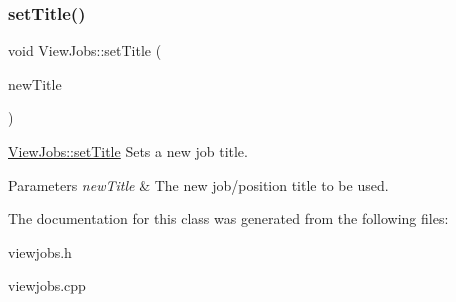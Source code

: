 \subsubsection{\texorpdfstring{set\+Title()}{setTitle()}}
{\footnotesize\ttfamily void View\+Jobs\+::set\+Title (\begin{DoxyParamCaption}\item[{Q\+String}]{new\+Title }\end{DoxyParamCaption})}



\hyperlink{class_view_jobs_abfe1969197cde57ea049c1b7d91cd4f5}{View\+Jobs\+::set\+Title} Sets a new job title. 


\begin{DoxyParams}{Parameters}
{\em new\+Title} & The new job/position title to be used. \\
\hline
\end{DoxyParams}


The documentation for this class was generated from the following files\+:\begin{DoxyCompactItemize}
\item 
viewjobs.\+h\item 
viewjobs.\+cpp\end{DoxyCompactItemize}
